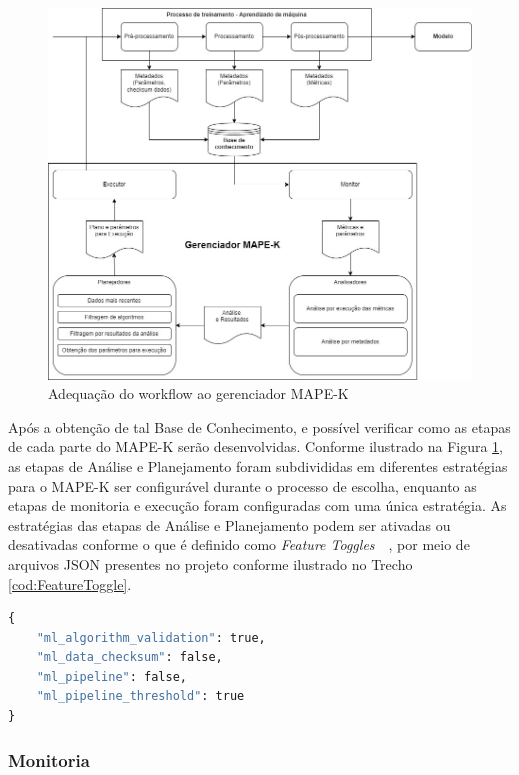 \documentclass[portugues]{ic-tese}
\begin{document}
\begin{figure}[H]
\centering
\includegraphics[scale=0.5]{images/ML-MAPE-K.jpg}
\caption {Adequação do workflow ao gerenciador MAPE-K}
\label{fig:MLMAPEK}
\end{figure}

Após a obtenção de tal Base de Conhecimento, e possível verificar como as etapas de cada parte do MAPE-K serão desenvolvidas. Conforme ilustrado na Figura \ref{fig:MLMAPEK}, as etapas de Análise e Planejamento foram subdivididas em diferentes estratégias para o MAPE-K ser configurável durante o processo de escolha, enquanto as etapas de monitoria e execução foram configuradas com uma única estratégia. As estratégias das etapas de Análise e Planejamento podem ser ativadas ou desativadas conforme o que é definido como \textit{Feature Toggles}~\citep{Rahman_2016}~\citep{Mahdavi-hezaveh_2021}, por meio de arquivos JSON presentes no projeto conforme ilustrado no Trecho \ref{cod:FeatureToggle}.

\begin{lstlisting}[language=Python, caption=Exemplo de arquivo utilizando \textit{Feature Toggles},label=cod:FeatureToggle]
{
	"ml_algorithm_validation": true,
	"ml_data_checksum": false,
	"ml_pipeline": false,
	"ml_pipeline_threshold": true	
}
\end{lstlisting}

\subsubsection{Monitoria}
\end{document}
